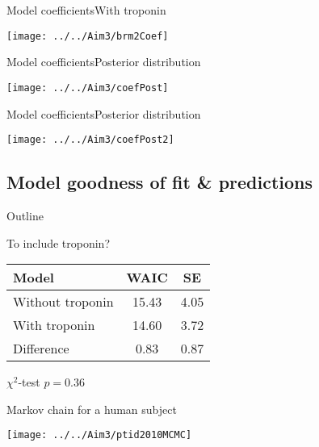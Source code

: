 \documentclass[xcolor=dvipsnames]{beamer}
\begin{document}
\begin{frame}{Model coefficients}{With troponin}
	\vspace{-5pt}
	\begin{center}
		\texttt{[image: ../../Aim3/brm2Coef]}
	\end{center}
\end{frame}

\begin{frame}{Model coefficients}{Posterior distribution}
		\vspace{-5pt}
		\begin{center}
			\texttt{[image: ../../Aim3/coefPost]}
		\end{center}
\end{frame}

\begin{frame}{Model coefficients}{Posterior distribution}
	\vspace{-5pt}
	\begin{center}
		\texttt{[image: ../../Aim3/coefPost2]}
	\end{center}
\end{frame}

\subsection{Model goodness of fit \& predictions}
\begin{frame}{Outline}
	\vspace{-10.5pt}
	\tableofcontents[currentsection,subsectionstyle=show/shaded/hide]
\end{frame}

\begin{frame}{To include troponin?}
	\vspace{-10.5pt}
	\begin{center}
		\begin{tabular}{lcc}
			\hline
			Model & WAIC  & SE \\
			\hline
			Without troponin & 15.43 & 4.05 \\ 
			With troponin & 14.60 & 3.72 \\
			Difference & 0.83 & 0.87 \\
			\hline
		\end{tabular}
		
		$\chi^2$-test $p=0.36$
	\end{center}
\end{frame}

\begin{frame}{Markov chain for a human subject}
	\vspace{-5pt}
	\begin{center}
		\texttt{[image: ../../Aim3/ptid2010MCMC]}
	\end{center}
\end{frame}
\end{document}
